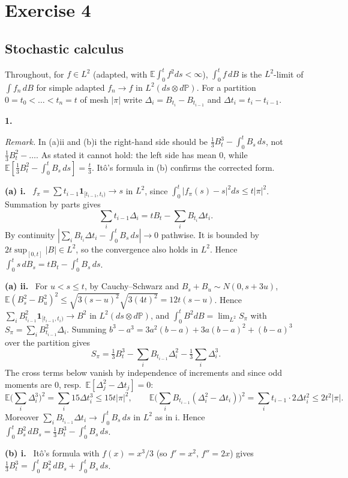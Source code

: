 \documentclass[11pt,a4paper]{article}
\newcommand{\E}{\mathbb{E}}
\renewcommand{\P}{\mathbb{P}}
\newcommand{\1}{\mathbf{1}}
\newcommand{\prob}[1]{\par\medskip\noindent\textbf{#1}\quad}
\newcommand{\sub}[1]{\par\smallskip\noindent\textbf{#1}\ }
\newcommand{\note}[1]{\par\noindent\emph{Remark.} #1}
\begin{document}
\section*{Exercise 4}
\subsection*{Stochastic calculus}

Throughout, for $f\in L^2$ (adapted, with $\E\int_0^tf^2ds<\infty$), $\int_0^tf\,dB$ is the $L^2$-limit of
$\int f_n\,dB$ for simple adapted $f_n\to f$ in $L^2(ds\otimes d\P)$. For a partition
$0=t_0<\dots<t_n=t$ of mesh $|\pi|$ write $\Delta_i=B_{t_i}-B_{t_{i-1}}$ and $\Delta t_i=t_i-t_{i-1}$.

\prob{1.}
\note{In (a)ii and (b)i the right-hand side should be $\frac13B_t^3-\int_0^tB_s\,ds$, not $\frac13B_t^2-\dots$.
As stated it cannot hold: the left side has mean $0$, while $\E[\frac13B_t^2-\int_0^tB_s\,ds]=\frac t3$.
Itô's formula in (b) confirms the corrected form.}

\sub{(a) i.} $f_\pi=\sum t_{i-1}\1_{[t_{i-1},t_i)}\to s$ in $L^2$, since $\int_0^t|f_\pi(s)-s|^2ds\le t|\pi|^2$. Summation by parts gives
\[
\sum_it_{i-1}\Delta_i=tB_t-\sum_iB_{t_i}\Delta t_i .
\]
By continuity $|\sum_iB_{t_i}\Delta t_i-\int_0^tB_s\,ds|\to0$ pathwise. It is bounded by $2t\sup_{[0,t]}|B|\in L^2$,
so the convergence also holds in $L^2$. Hence $\int_0^ts\,dB_s=tB_t-\int_0^tB_s\,ds$.

\sub{(a) ii.} For $u<s\le t$, by Cauchy--Schwarz and $B_s+B_u\sim N(0,s+3u)$,
$\E(B_s^2-B_u^2)^2\le\sqrt{3(s-u)^2}\sqrt{3(4t)^2}=12t(s-u)$. Hence
$\sum_iB_{t_{i-1}}^2\1_{[t_{i-1},t_i)}\to B^2$ in $L^2(ds\otimes d\P)$, and $\int_0^tB^2dB=\lim_{L^2}S_\pi$
with $S_\pi=\sum_iB_{t_{i-1}}^2\Delta_i$. Summing $b^3-a^3=3a^2(b-a)+3a(b-a)^2+(b-a)^3$ over the partition gives
\[
S_\pi=\tfrac13B_t^3-\sum_iB_{t_{i-1}}\Delta_i^2-\tfrac13\sum_i\Delta_i^3 .
\]
The cross terms below vanish by independence of increments and since odd moments are $0$, resp.\ $\E[\Delta_j^2-\Delta t_j]=0$:
\[
\E\Big(\sum_i\Delta_i^3\Big)^2=\sum_i15\Delta t_i^3\le15t|\pi|^2,\qquad
\E\Big(\sum_iB_{t_{i-1}}(\Delta_i^2-\Delta t_i)\Big)^2=\sum_it_{i-1}\cdot2\Delta t_i^2\le2t^2|\pi| .
\]
Moreover $\sum_iB_{t_{i-1}}\Delta t_i\to\int_0^tB_s\,ds$ in $L^2$ as in i. Hence
$\int_0^tB_s^2\,dB_s=\frac13B_t^3-\int_0^tB_s\,ds$.

\sub{(b) i.} Itô's formula with $f(x)=x^3/3$ (so $f'=x^2$, $f''=2x$) gives
$\frac13B_t^3=\int_0^tB_s^2\,dB_s+\int_0^tB_s\,ds$.
\end{document}
